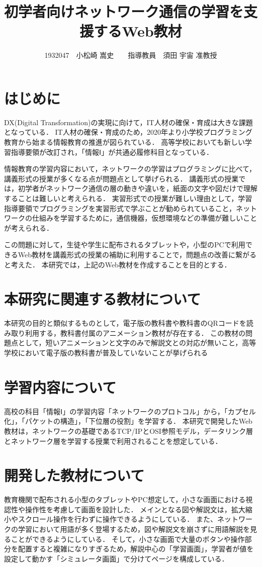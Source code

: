 \documentclass[twocolumn,10pt,a4j]{ltjsarticle}
\title{初学者向けネットワーク通信の学習を支援するWeb教材}
\author{1932047　小松崎 嵩史　　指導教員　須田 宇宙 准教授}
\date{}
\begin{document}
\maketitle

\section{はじめに}

DX(Digital Transformation)の実現に向けて，IT人材の確保・育成は大きな課題となっている\cite{dx}．
IT人材の確保・育成のため，2020年より小学校プログラミング教育から始まる情報教育の推進が図られている．
高等学校においても新しい学習指導要領が改訂され，「情報Ⅰ」が共通必履修科目となっている．


情報教育の学習内容において，ネットワークの学習はプログラミングに比べて，講義形式の授業が多くなる点が問題点として挙げられる．
講義形式の授業では，初学者がネットワーク通信の層の動きや違いを，紙面の文字や図だけで理解することは難しいと考えられる．
実習形式での授業が難しい理由として，学習指導要領でプログラミングを実習形式で学ぶことが勧められていること，ネットワークの仕組みを学習するために，通信機器，仮想環境などの準備が難しいことが考えられる．

この問題に対して，生徒や学生に配布されるタブレットや，小型のPCで利用できるWeb教材を講義形式の授業の補助に利用することで，問題点の改善に繋がると考えた．
本研究では，上記のWeb教材を作成することを目的とする．

\section{本研究に関連する教材について}
本研究の目的と類似するものとして，電子版の教科書や教科書のQRコードを読み取り利用する，教科書付属のアニメーション教材が存在する．
この教材の問題点として，短いアニメーションと文字のみで解説文との対応が無いこと，高等学校において電子版の教科書が普及していないことが挙げられる

\section{学習内容について}
高校の科目「情報Ⅰ」の学習内容「ネットワークのプロトコル」から，「カプセル化」，「パケットの構造」，「下位層の役割」を学習する．
本研究で開発したWeb教材は，ネットワークの基礎であるTCP/IPとOSI参照モデル，データリンク層とネットワーク層を学習する授業で利用されることを想定している．

\section{開発した教材について}
教育機関で配布される小型のタブレットやPC想定して，小さな画面における視認性や操作性を考慮して画面を設計した．
メインとなる図や解説文は，拡大縮小やスクロール操作を行わずに操作できるようにしている．
また、ネットワークの学習において用語が多く登場するため，図や解説文を崩さずに用語解説を見ることができるようにしている．
そして，小さな画面で大量のボタンや操作部分を配置すると複雑になりすぎるため，解説中心の「学習画面」，学習者が値を設定して動かす「シミュレータ画面」で分けてページを構成している．
\end{document}
